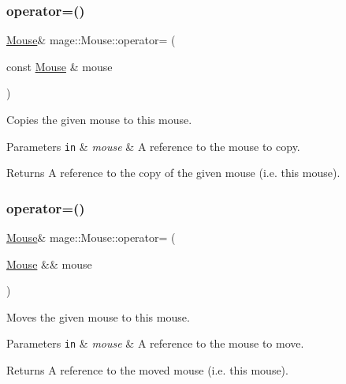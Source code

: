 \subsubsection{\texorpdfstring{operator=()}{operator=()}\hspace{0.1cm}{\footnotesize\ttfamily [1/2]}}
{\footnotesize\ttfamily \hyperlink{classmage_1_1_mouse}{Mouse}\& mage\+::\+Mouse\+::operator= (\begin{DoxyParamCaption}\item[{const \hyperlink{classmage_1_1_mouse}{Mouse} \&}]{mouse }\end{DoxyParamCaption})\hspace{0.3cm}{\ttfamily [delete]}}

Copies the given mouse to this mouse.


\begin{DoxyParams}[1]{Parameters}
\mbox{\tt in}  & {\em mouse} & A reference to the mouse to copy. \\
\hline
\end{DoxyParams}
\begin{DoxyReturn}{Returns}
A reference to the copy of the given mouse (i.\+e. this mouse). 
\end{DoxyReturn}
\hypertarget{classmage_1_1_mouse_a42d80f535a12356762a506438036dd71}{}\label{classmage_1_1_mouse_a42d80f535a12356762a506438036dd71} 
\subsubsection{\texorpdfstring{operator=()}{operator=()}\hspace{0.1cm}{\footnotesize\ttfamily [2/2]}}
{\footnotesize\ttfamily \hyperlink{classmage_1_1_mouse}{Mouse}\& mage\+::\+Mouse\+::operator= (\begin{DoxyParamCaption}\item[{\hyperlink{classmage_1_1_mouse}{Mouse} \&\&}]{mouse }\end{DoxyParamCaption})\hspace{0.3cm}{\ttfamily [delete]}}

Moves the given mouse to this mouse.


\begin{DoxyParams}[1]{Parameters}
\mbox{\tt in}  & {\em mouse} & A reference to the mouse to move. \\
\hline
\end{DoxyParams}
\begin{DoxyReturn}{Returns}
A reference to the moved mouse (i.\+e. this mouse). 
\end{DoxyReturn}
\hypertarget{classmage_1_1_mouse_a0cddae3f871dd69c1ba6928dc6b1f985}{}\label{classmage_1_1_mouse_a0cddae3f871dd69c1ba6928dc6b1f985} 
